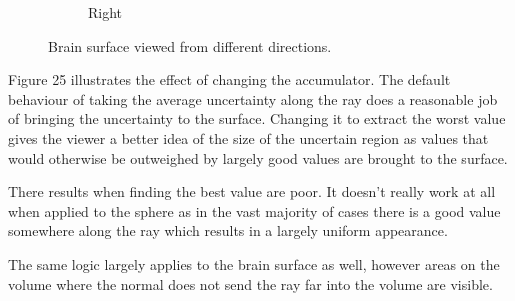\begin{figure}[h]
\begin{subfigure}[b]{0.20\textwidth}
    \caption*{Right}
    \label{fig:surface_right}
  \end{subfigure}
  \caption{Brain surface viewed from different directions.}\label{fig:surface180}
\end{figure}

Figure 25 illustrates the effect of changing the accumulator. The default behaviour of taking the average uncertainty along the ray does a reasonable job of bringing the uncertainty to the surface. Changing it to extract the worst value gives the viewer a better idea of the size of the uncertain region as values that would otherwise be outweighed by largely good values are brought to the surface.

There results when finding the best value are poor. It doesn't really work at all when applied to the sphere as in the vast majority of cases there is a good value somewhere along the ray which results in a largely uniform appearance. 

The same logic largely applies to the brain surface as well, however areas on the volume where the normal does not send the ray far into the volume are visible.

